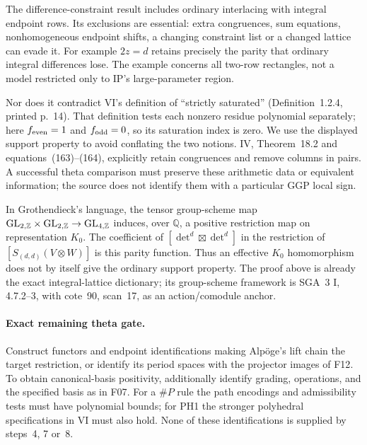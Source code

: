 \documentclass[11pt,a4paper]{article}
\newcommand{\Q}{\mathbb Q}\newcommand{\Z}{\mathbb Z}\newcommand{\C}{\mathbb C}\newcommand{\N}{\mathbb N}\newcommand{\F}{\mathbb F}
\newcommand{\fid}[1]{\textsf{#1}}\newcommand{\gate}[1]{\textsf{#1}}
\theoremstyle{named}\newtheorem{finding}{Finding}[section]
\theoremstyle{definition}\newtheorem{definition}[finding]{Definition}
\theoremstyle{remark}\newtheorem{remark}[finding]{Remark}
\begin{document}
The difference-constraint result includes ordinary interlacing with integral endpoint rows. Its exclusions are essential: extra congruences, sum equations, nonhomogeneous endpoint shifts, a changing constraint list or a changed lattice can evade it. For example $2z=d$ retains precisely the parity that ordinary integral differences lose. The example concerns all two-row rectangles, not a model restricted only to IP's large-parameter region.

Nor does it contradict VI's definition of ``strictly saturated'' (Definition~1.2.4, printed p.~14). That definition tests each nonzero residue polynomial separately; here $f_{\rm even}=1$ and $f_{\rm odd}=0$, so its saturation index is zero. We use the displayed support property to avoid conflating the two notions. IV, Theorem~18.2 and equations~(163)--(164), explicitly retain congruences and remove columns in pairs. A successful theta comparison must preserve these arithmetic data or equivalent information; the source does not identify them with a particular GGP local sign.

In Grothendieck's language, the tensor group-scheme map $\GL_{2,\Z}\times\GL_{2,\Z}\to\GL_{4,\Z}$ induces, over $\Q$, a positive restriction map on representation $K_0$. The coefficient of $[\det^d\boxtimes\det^d]$ in the restriction of $[S_{(d,d)}(V\otimes W)]$ is this parity function. Thus an effective $K_0$ homomorphism does not by itself give the ordinary support property. The proof above is already the exact integral-lattice dictionary; its group-scheme framework is SGA~3 I, 4.7.2--3, with cote~90, scan~17, as an action/comodule anchor.

\paragraph{Exact remaining theta gate.}
Construct functors and endpoint identifications making Alp\"oge's lift chain the target restriction, or identify its period spaces with the projector images of \fid{F12}. To obtain canonical-basis positivity, additionally identify grading, operations, and the specified basis as in \fid{F07}. For a \(\#P\) rule the path encodings and admissibility tests must have polynomial bounds; for PH1 the stronger polyhedral specifications in VI must also hold. None of these identifications is supplied by steps~4, 7 or~8.

\end{document}

